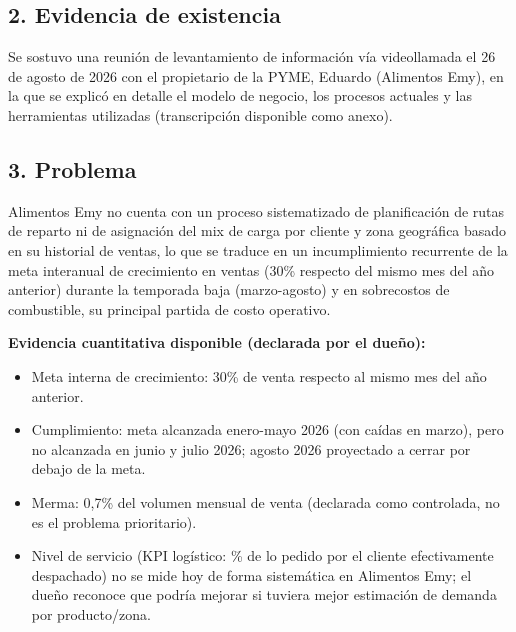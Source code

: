 \documentclass[10pt,a4paper]{article}
\begin{document}
\subsection*{2. Evidencia de existencia}

Se sostuvo una reunión de levantamiento de información vía videollamada el 26 de agosto de 2026 con el propietario de la PYME, Eduardo (Alimentos Emy), en la que se explicó en detalle el modelo de negocio, los procesos actuales y las herramientas utilizadas (transcripción disponible como anexo).

\subsection*{3. Problema}

Alimentos Emy no cuenta con un proceso sistematizado de planificación de rutas de reparto ni de asignación del mix de carga por cliente y zona geográfica basado en su historial de ventas, lo que se traduce en un incumplimiento recurrente de la meta interanual de crecimiento en ventas (30\% respecto del mismo mes del año anterior) durante la temporada baja (marzo-agosto) y en sobrecostos de combustible, su principal partida de costo operativo.

\vspace{0.3cm}

\textbf{Evidencia cuantitativa disponible (declarada por el dueño):}
\begin{itemize}[leftmargin=1.2cm]
    \item Meta interna de crecimiento: 30\% de venta respecto al mismo mes del año anterior.
    \item Cumplimiento: meta alcanzada enero-mayo 2026 (con caídas en marzo), pero no alcanzada en junio y julio 2026; agosto 2026 proyectado a cerrar por debajo de la meta.  
    \item Merma: 0,7\% del volumen mensual de venta (declarada como controlada, no es el problema prioritario).
    \item Nivel de servicio (KPI logístico: \% de lo pedido por el cliente efectivamente despachado) no se mide hoy de forma sistemática en Alimentos Emy; el dueño reconoce que podría mejorar si tuviera mejor estimación de demanda por producto/zona.
    
\end{itemize}
\end{document}
